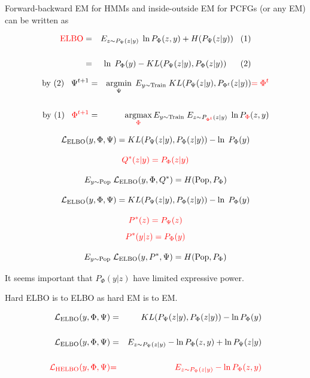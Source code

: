 {
Forward-backward EM for HMMs and inside-outside EM for PCFGs (or any EM) can be written as

\vfill
\begin{eqnarray*}
\mathrm{\color{red} ELBO}& = & E_{z \sim P_\Psi(z|y)}\; \ln P_\Phi(z,y) + H(P_\Psi(z|y))\;\;\;(1) \\
 \\      
  & = & \ln\;P_{\Phi}(y) - KL(P_\Psi(z|y),P_{\Phi}(z|y))\;\;\;\;\;\;(2)
\end{eqnarray*}

\vfill
\begin{eqnarray*}
\mbox{by (2)}\;\;\;\Psi^{t+1} & = & \operatorname*{argmin}_\Psi \;E_{y \sim \mathrm{Train}} \; KL(P_{\Psi}(z|y),P_{\Phi^t}(z|y)) {\color{red} = \Phi^t} \\
\\
\mbox{by (1)}\;\;\;{\color{red} \Phi^{t+1}} & = & \operatorname*{argmax}_{\color{red} \Phi} E_{y \sim \mathrm{Train}} \;E_{z \sim P_{\color{red} {\Phi^t}}(z|y)}\; \ln P_{\color{red} \Phi}(z,y)
\end{eqnarray*}


$${\cal L}_{\mathrm{ELBO}}(y,\Phi,\Psi) = KL(P_\Psi(z|y),P_{\Phi}(z|y)) - \ln\;P_{\Phi}(y)$$

\vfill
$${\color{red} Q^*(z|y) = P_\Phi(z|y)}$$

\vfill
$$E_{y \sim \mathrm{Pop}}\;{\cal L}_{\mathrm{ELBO}}(y,\Phi,Q^*) = H(\mathrm{Pop},P_\Phi)$$


$${\cal L}_{\mathrm{ELBO}}(y,\Phi,\Psi) = KL(P_\Psi(z|y),P_{\Phi}(z|y)) - \ln\;P_{\Phi}(y)$$

$${\color{red} P^*(z) = P_\Psi(z)}$$
$${\color{red} P^*(y|z) = P_\Phi(y)}$$

$$E_{y \sim \mathrm{Pop}}\;{\cal L}_{\mathrm{ELBO}}(y,P^*,\Psi) = H(\mathrm{Pop},P_\Phi)$$

\vfill
It seems important that $P_\Phi(y|z)$ have limited expressive power.


Hard ELBO is to ELBO as hard EM is to EM.


\vfill
\begin{eqnarray*}
{\cal L}_{\mathrm{ELBO}}(y,\Phi,\Psi) &  =  & KL(P_\Psi(z|y),P_\Phi(z|y)) - \ln P_\Phi(y) \\
\\
{\cal L}_{\mathrm{ELBO}}(y,\Phi,\Psi) &  =  & E_{z \sim P_\Psi(z|y)} - \ln P_\Phi(z,y) + \ln P_\Psi(z|y) \\
\\
{\color{red} {\cal L}_{\mathrm{HELBO}}(y,\Phi,\Psi)} & {\color{red}  =} & {\color{red}  E_{z \sim P_\Psi(z|y)} - \ln P_\Phi(z,y)}
\end{eqnarray*}


}
